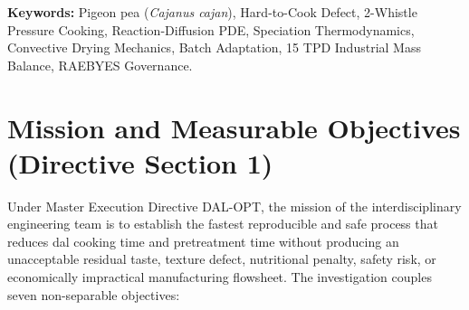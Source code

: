 \documentclass[10pt,a4paper]{article}
\newcommand{\inr}{\text{INR~}}
\begin{document}
\begin{abstract}
viscoelastic tensile stress to $0.711$~MPa ($0.431\times$ yield stress), suppressing grain breakage to $0.35\%$ compared to $3.19\%$ under 85$^\circ$C flash drying. An 85\% bleed-and-feed liquor recycle loop reduced operating chemical costs to \inr3.63/kg (95\% CI: [3.32, 3.94]) and total manufacturing OpEx to \inr6.34/kg (95\% CI: [5.95, 6.74]), demonstrating technical and commercial viability.
\end{abstract}

\vspace{0.2cm}
\noindent\textbf{Keywords:} Pigeon pea (\textit{Cajanus cajan}), Hard-to-Cook Defect, 2-Whistle Pressure Cooking, Reaction-Diffusion PDE, Speciation Thermodynamics, Convective Drying Mechanics, Batch Adaptation, 15 TPD Industrial Mass Balance, RAEBYES Governance.

\section{Mission and Measurable Objectives (Directive Section 1)}
Under Master Execution Directive DAL-OPT, the mission of the interdisciplinary engineering team is to establish the fastest reproducible and safe process that reduces dal cooking time and pretreatment time without producing an unacceptable residual taste, texture defect, nutritional penalty, safety risk, or economically impractical manufacturing flowsheet. The investigation couples seven non-separable objectives:
\end{document}
